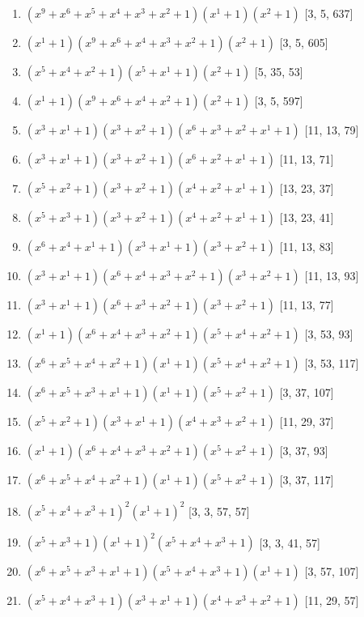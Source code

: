 \documentclass[10pt,twocolumn]{article}
\begin{document}
\begin{enumerate}
\item $(x^{9} + x^{6} + x^{5} + x^{4} + x^{3} + x^{2} + 1)(x^{1} + 1)(x^{2} + 1)$  [3, 5, 637]
\item $(x^{1} + 1)(x^{9} + x^{6} + x^{4} + x^{3} + x^{2} + 1)(x^{2} + 1)$  [3, 5, 605]
\item $(x^{5} + x^{4} + x^{2} + 1)(x^{5} + x^{1} + 1)(x^{2} + 1)$  [5, 35, 53]
\item $(x^{1} + 1)(x^{9} + x^{6} + x^{4} + x^{2} + 1)(x^{2} + 1)$  [3, 5, 597]
\item $(x^{3} + x^{1} + 1)(x^{3} + x^{2} + 1)(x^{6} + x^{3} + x^{2} + x^{1} + 1)$  [11, 13, 79]
\item $(x^{3} + x^{1} + 1)(x^{3} + x^{2} + 1)(x^{6} + x^{2} + x^{1} + 1)$  [11, 13, 71]
\item $(x^{5} + x^{2} + 1)(x^{3} + x^{2} + 1)(x^{4} + x^{2} + x^{1} + 1)$  [13, 23, 37]
\item $(x^{5} + x^{3} + 1)(x^{3} + x^{2} + 1)(x^{4} + x^{2} + x^{1} + 1)$  [13, 23, 41]
\item $(x^{6} + x^{4} + x^{1} + 1)(x^{3} + x^{1} + 1)(x^{3} + x^{2} + 1)$  [11, 13, 83]
\item $(x^{3} + x^{1} + 1)(x^{6} + x^{4} + x^{3} + x^{2} + 1)(x^{3} + x^{2} + 1)$  [11, 13, 93]
\item $(x^{3} + x^{1} + 1)(x^{6} + x^{3} + x^{2} + 1)(x^{3} + x^{2} + 1)$  [11, 13, 77]
\item $(x^{1} + 1)(x^{6} + x^{4} + x^{3} + x^{2} + 1)(x^{5} + x^{4} + x^{2} + 1)$  [3, 53, 93]
\item $(x^{6} + x^{5} + x^{4} + x^{2} + 1)(x^{1} + 1)(x^{5} + x^{4} + x^{2} + 1)$  [3, 53, 117]
\item $(x^{6} + x^{5} + x^{3} + x^{1} + 1)(x^{1} + 1)(x^{5} + x^{2} + 1)$  [3, 37, 107]
\item $(x^{5} + x^{2} + 1)(x^{3} + x^{1} + 1)(x^{4} + x^{3} + x^{2} + 1)$  [11, 29, 37]
\item $(x^{1} + 1)(x^{6} + x^{4} + x^{3} + x^{2} + 1)(x^{5} + x^{2} + 1)$  [3, 37, 93]
\item $(x^{6} + x^{5} + x^{4} + x^{2} + 1)(x^{1} + 1)(x^{5} + x^{2} + 1)$  [3, 37, 117]
\item $(x^{5} + x^{4} + x^{3} + 1)^{2}(x^{1} + 1)^{2}$  [3, 3, 57, 57]
\item $(x^{5} + x^{3} + 1)(x^{1} + 1)^{2}(x^{5} + x^{4} + x^{3} + 1)$  [3, 3, 41, 57]
\item $(x^{6} + x^{5} + x^{3} + x^{1} + 1)(x^{5} + x^{4} + x^{3} + 1)(x^{1} + 1)$  [3, 57, 107]
\item $(x^{5} + x^{4} + x^{3} + 1)(x^{3} + x^{1} + 1)(x^{4} + x^{3} + x^{2} + 1)$  [11, 29, 57]

\end{enumerate}
\end{document}
